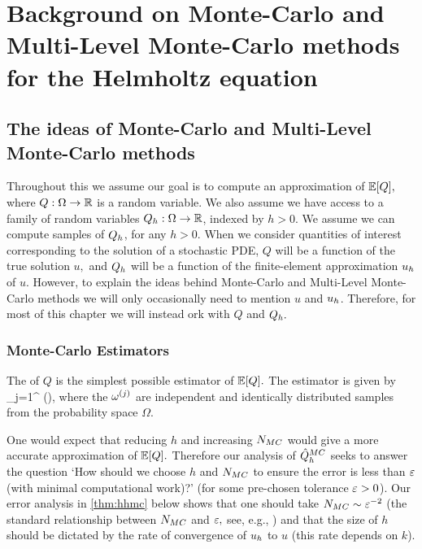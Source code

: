 \section{Background on Monte-Carlo and Multi-Level Monte-Carlo methods for the Helmholtz equation}\label{sec:overview}
\subsection{The ideas of Monte-Carlo and Multi-Level Monte-Carlo methods}\label{sec:mlmcideasoverview}
Throughout this  we assume our goal is to compute an approximation of $\EXP{Q},$ where $Q:\Omega\rightarrow\mathbb R$ is a random variable. We also assume we have access to a family of random variables $Q_{h}:\Omega\rightarrow\mathbb R$, indexed by $h>0.$ We assume we can compute samples of $Q_{h}$, for any $h>0$. When we consider quantities of interest corresponding to the solution of a stochastic PDE, $Q$ will be a function of the true solution $u,$ and $Q_{h}$ will be a function of the finite-element approximation $u_{h}$ of $u.$ However, to explain the ideas behind Monte-Carlo and Multi-Level Monte-Carlo methods we will only occasionally need to mention $u$ and $u_{h}$. Therefore, for most of this chapter we will instead ork with $Q$ and $Q_{h}.$

\subsubsection{Monte-Carlo Estimators}

The  of $Q$ is the simplest possible estimator of $\EXP{Q}.$ The estimator is given by
\beqs
\QhatMC \de {} \sum_{j=1}^{\NMC} \Qh\mleft(\omegasj\mright),
\eeqs
where the $\omega^{(j)}$ are independent and identically distributed samples from the probability space $\Omega$.

One would expect that reducing $h$ and increasing $N_{MC}$ would give a more accurate approximation of $\EXP{Q}.$ Therefore our analysis of $\hat{Q}^{MC}_{h}$ seeks to answer the question `How should we choose $h$ and $N_{MC}$ to ensure the error is less than $\varepsilon$ (with minimal computational work)?' (for some pre-chosen tolerance $\varepsilon > 0$). Our error analysis in \cref{thm:hhmc} below shows that one should take $N_{MC} \sim \varepsilon^{-2}$ (the standard relationship between $N_{MC}$ and $\varepsilon,$ see, e.g., \cite[Text after equation (3)]{ClGiScTe:11}) and that the size of $h$ should be dictated by the rate of convergence of $u_{h}$ to $u$ (this rate depends on $k$).

